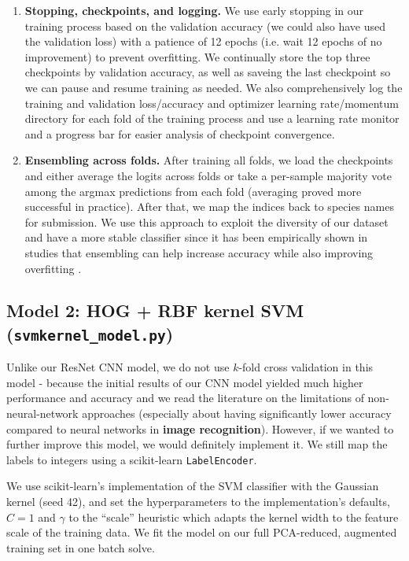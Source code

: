 \documentclass[10pt]{article} %
\begin{document}
\begin{enumerate}
  \item\textbf{Stopping, checkpoints, and logging.} We use early stopping in our training process based on the validation accuracy (we could also have used the validation loss) with a patience  of 12 epochs (i.e. wait 12 epochs of no improvement) to prevent overfitting. We continually store the top three checkpoints by validation accuracy, as well as saveing the last checkpoint so we can pause and resume training as needed. We also comprehensively log the training and validation loss/accuracy and optimizer learning rate/momentum directory for each fold of the training process and use a learning rate monitor and a progress bar for easier analysis of checkpoint convergence.
  \item\textbf{Ensembling across folds.} After training all folds, we load the checkpoints and either average the logits across folds or take a per-sample majority vote among the argmax predictions from each fold (averaging proved more successful in practice). After that, we map the indices back to species names for submission. We use this approach to exploit the diversity of our dataset and have a more stable classifier since it has been empirically shown in studies that ensembling can help increase accuracy while also improving overfitting \cite{8539396}.
\end{enumerate}
\subsection{Model 2: HOG + RBF kernel SVM (\texttt{svmkernel\_model.py})}
Unlike our ResNet CNN model, we do not use $k$-fold cross validation in this model - because the initial results of our CNN model yielded much higher performance and accuracy and we read the literature on the limitations of non-neural-network approaches (especially about having significantly lower accuracy compared to neural networks in \textbf{image recognition})\cite{WANG202161}. However, if we wanted to further improve this model, we would definitely implement it. We still map the labels to integers using a scikit-learn \texttt{LabelEncoder}.

We use scikit-learn's implementation of the SVM classifier with the Gaussian kernel (seed 42), and set the hyperparameters to the implementation's defaults, $C=1$ and $\gamma$ to the ``scale'' heuristic which adapts the kernel width to the feature scale of the training data. We fit the model on our full PCA-reduced, augmented training set in one batch solve.
\end{document}
